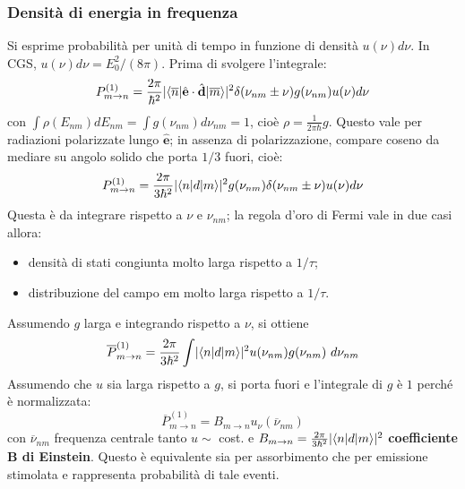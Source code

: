\documentclass[10pt, a4paper]{scrartcl}
\numberwithin{equation}{subsection}
\theoremstyle{style1}
\theoremstyle{style2}
\begin{document}
\subsubsection{Densit\`a di energia in frequenza}
Si esprime probabilit\`a per unit\`a di tempo in funzione di densit\`a $u(\nu ) d\nu $. In CGS, $u(\nu ) d\nu  = E_0^2 / (8\pi)$. Prima di svolgere l'integrale:
\begin{equation}
	P^{(1)} _{m\to n}  = \frac{2\pi}{\hbar ^2} \lvert \braket{\overline{n}|\hat{\mathbf{e}}\cdot \hat{\mathbf{d} }|\overline{m}}  \rvert ^2 \delta (\nu _{nm} \pm\nu ) g(\nu _{nm} )u (\nu ) d\nu 
\end{equation}
con $\int \rho (E_{nm} ) dE_{nm} = \int g(\nu _{nm} ) d\nu _{nm}  = 1 $, cio\`e $\rho = \frac{1}{2\pi \hbar }g$. 
Questo vale per radiazioni polarizzate lungo $\hat{\mathbf{e} }$; in assenza di polarizzazione, compare coseno da mediare su angolo solido che porta $1 /3 $ fuori, cio\`e:
\begin{equation}
	P^{(1)} _{m\to n} = \frac{2\pi}{3 \hbar ^2}\lvert \braket{n|d|m}  \rvert ^2 g(\nu _{nm} ) \delta (\nu _{nm} \pm\nu ) u(\nu ) d\nu 
\end{equation}
Questa \`e da integrare rispetto a $\nu $ e $\nu _{nm} $; la regola d'oro di Fermi vale in due casi allora:
\begin{itemize}
	\item densit\`a di stati congiunta molto larga rispetto a $1 / \tau $;
	\item distribuzione del campo em molto larga rispetto a $1 / \tau $.
\end{itemize}
Assumendo $g$ larga e integrando rispetto a $\nu $, si ottiene
\[
\overline{P}^{(1)} _{m\to n}  = \frac{2\pi}{3\hbar ^2}\int \lvert \braket{n|d|m}  \rvert ^2 u(\nu _{nm} ) g(\nu _{nm} )\ d \nu _{nm} 
\] 
Assumendo che $u$ sia larga rispetto a $g$, si porta fuori e l'integrale di $g$ \`e $1$ perch\'e \`e normalizzata:
\begin{equation}
	\overline{P}^{(1)} _{m\to n} = B_{m\to n} u_{\nu } (\overline{\nu }_{nm} )
\end{equation}
con $\overline{\nu }_{nm} $ frequenza centrale tanto $u\sim$ cost. e $B_{m\to n} = \frac{2\pi}{3\hbar ^2}\lvert \braket{n|d|m}  \rvert ^2$ \textbf{coefficiente B di Einstein}.
Questo \`e equivalente sia per assorbimento che per emissione stimolata e rappresenta probabilit\`a di tale eventi.
\end{document}

